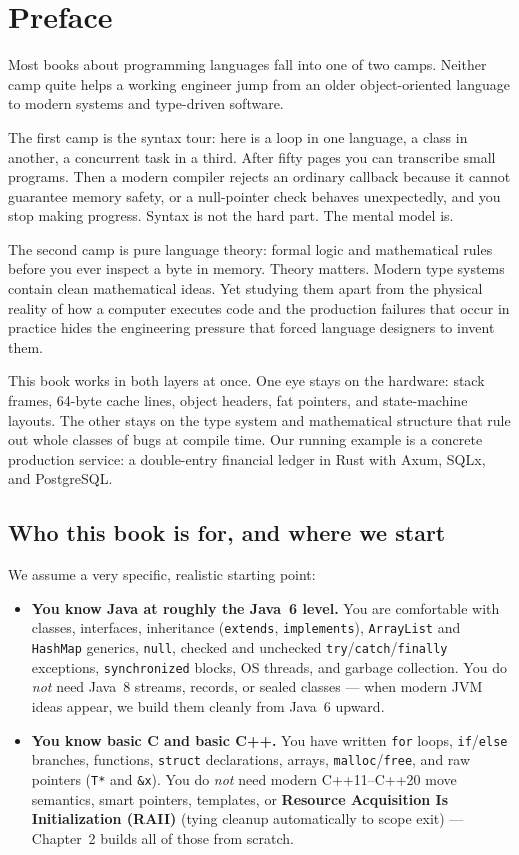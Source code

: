 \chapter*{Preface}

Most books about programming languages fall into one of two camps. Neither camp quite helps a working engineer jump from an older object-oriented language to modern systems and type-driven software.

The first camp is the syntax tour: here is a loop in one language, a class in another, a concurrent task in a third. After fifty pages you can transcribe small programs. Then a modern compiler rejects an ordinary callback because it cannot guarantee memory safety, or a null-pointer check behaves unexpectedly, and you stop making progress. Syntax is not the hard part. The mental model is.

The second camp is pure language theory: formal logic and mathematical rules before you ever inspect a byte in memory. Theory matters. Modern type systems contain clean mathematical ideas. Yet studying them apart from the physical reality of how a computer executes code and the production failures that occur in practice hides the engineering pressure that forced language designers to invent them.

This book works in both layers at once. One eye stays on the hardware: stack frames, 64-byte cache lines, object headers, fat pointers, and state-machine layouts. The other stays on the type system and mathematical structure that rule out whole classes of bugs at compile time. Our running example is a concrete production service: a double-entry financial ledger in Rust with Axum, SQLx, and PostgreSQL.

\section*{Who this book is for, and where we start}

We assume a very specific, realistic starting point:
\begin{itemize}
  \item \textbf{You know Java at roughly the Java~6 level.} You are comfortable with classes, interfaces, inheritance (\texttt{extends}, \texttt{implements}), \texttt{ArrayList} and \texttt{HashMap} generics, \texttt{null}, checked and unchecked \texttt{try}/\texttt{catch}/\texttt{finally} exceptions, \texttt{synchronized} blocks, OS threads, and garbage collection. You do \emph{not} need Java~8 streams, records, or sealed classes --- when modern JVM ideas appear, we build them cleanly from Java~6 upward.
  \item \textbf{You know basic C and basic C++.} You have written \texttt{for} loops, \texttt{if}/\texttt{else} branches, functions, \texttt{struct} declarations, arrays, \texttt{malloc}/\texttt{free}, and raw pointers (\texttt{T*} and \texttt{\&x}). You do \emph{not} need modern C++11--C++20 move semantics, smart pointers, templates, or \textbf{Resource Acquisition Is Initialization (RAII)} (tying cleanup automatically to scope exit) --- Chapter~2 builds all of those from scratch.
\end{itemize}

